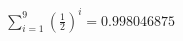 \documentclass[preview]{standalone}
\begin{document}
\begin{align*}
\sum_{i=1}^{9} \left(\frac{1}{2}\right)^i = {0.998046875}
\end{align*}
\end{document}

